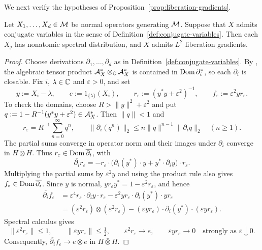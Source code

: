 We next verify the hypotheses of Proposition~\ref{prop:liberation-gradients}.
\begin{lemma}\label{lem:conjugate-liberation}
Let $X_1,\ldots,X_d\in\mathcal M$ be normal operators generating $\mathcal M$.
Suppose that $X$ admits conjugate variables in the sense of Definition~\ref{def:conjugate-variables}.
Then each $X_j$ has nonatomic spectral distribution, and $X$ admits $L^2$ liberation gradients.
\end{lemma}
\begin{proof}
Choose derivations $\partial_1,\ldots,\partial_d$ as in Definition~\ref{def:conjugate-variables}.
By \cite[Lemma~3.3]{ACSY24}, the algebraic tensor product $\mathcal A_X^\ast\otimes_{\mathbb C}\mathcal A_X^\ast$ is contained in $\operatorname{Dom}\partial_i^*$, so each $\partial_i$ is closable.
Fix $i$, $\lambda\in\mathbb C$ and $\varepsilon>0$, and set
\[
 y:=X_i-\lambda,\qquad e:=1_{\{\lambda\}}(X_i),\qquad
 r_\varepsilon:=(y^*y+\varepsilon^2)^{-1},\qquad
 f_\varepsilon:=\varepsilon^2yr_\varepsilon.
\]
To check the domains, choose $R>\|y\|^2+\varepsilon^2$ and put $q:=1-R^{-1}(y^*y+\varepsilon^2)\in\mathcal A_X^\ast$.
Then $\|q\|<1$ and
\[
 r_\varepsilon=R^{-1}\sum_{n=0}^\infty q^n,\qquad
 \|\partial_i(q^n)\|_2
 \leq n\|q\|^{n-1}\|\partial_i q\|_2
 \quad(n\geq1).
\]
The partial sums converge in operator norm and their images under $\partial_i$ converge in $H\bar\otimes H$.
Thus $r_\varepsilon\in\operatorname{Dom}\overline{\partial_i}$, with
\[
 \overline{\partial_i}r_\varepsilon
 =-r_\varepsilon\cdot
   \bigl(\partial_i(y^*)\cdot y+y^*\cdot\partial_i y\bigr)
   \cdot r_\varepsilon.
\]
Multiplying the partial sums by $\varepsilon^2y$ and using the product rule also gives $f_\varepsilon\in\operatorname{Dom}\overline{\partial_i}$.
Since $y$ is normal, $yr_\varepsilon y^*=1-\varepsilon^2r_\varepsilon$, and hence
\begin{align*}
 \overline{\partial_i}f_\varepsilon
 &=\varepsilon^4r_\varepsilon\cdot\partial_i y\cdot r_\varepsilon
   -\varepsilon^2yr_\varepsilon\cdot\partial_i(y^*)\cdot yr_\varepsilon\\
 &=(\varepsilon^2r_\varepsilon)\otimes(\varepsilon^2r_\varepsilon)
   -(\varepsilon yr_\varepsilon)\cdot\partial_i(y^*)
     \cdot(\varepsilon yr_\varepsilon).
\end{align*}
Spectral calculus gives
\[
 \|\varepsilon^2r_\varepsilon\|\leq1,\qquad
 \|\varepsilon yr_\varepsilon\|\leq\tfrac12,\qquad
 \varepsilon^2r_\varepsilon\longrightarrow e,\qquad
 \varepsilon yr_\varepsilon\longrightarrow0
 \quad\text{strongly as }\varepsilon\downarrow0.
\]
Consequently, $\overline{\partial_i}f_\varepsilon\to e\otimes e$ in $H\bar\otimes H$.

\end{proof}
